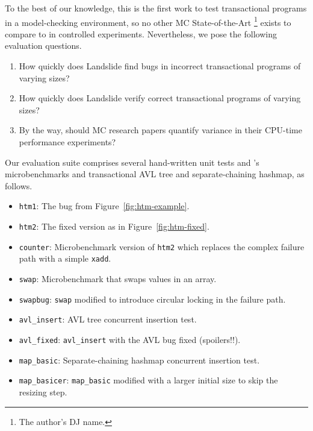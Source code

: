 \documentclass[10pt]{sigplanconf}
\begin{document}
To the best of our knowledge, this is the first work to test transactional programs in a model-checking environment,
so no other MC State-of-the-Art%
\footnote{The author's DJ name.}
exists to compare to in controlled experiments.
Nevertheless, we pose the following evaluation questions.

\begin{enumerate}
	\item How quickly does Landslide find bugs in incorrect transactional programs of varying sizes?
	\item How quickly does Landslide verify correct transactional programs of varying sizes?
	\item By the way, should MC research papers quantify variance in their CPU-time performance experiments?
\end{enumerate}

Our evaluation suite comprises several hand-written unit tests
and \cite{htm-mario}'s microbenchmarks and transactional AVL tree and separate-chaining hashmap,
as follows.

\begin{itemize}
	\item {\tt htm1}: The bug from Figure~\ref{fig:htm-example}. %
	\item {\tt htm2}: The fixed version as in Figure~\ref{fig:htm-fixed}.
	\item {\tt counter}: Microbenchmark version of {\tt htm2} which replaces the complex failure path with a simple {\tt xadd}.
	\item {\tt swap}: Microbenchmark that swaps values in an array.
	\item {\tt swapbug}: {\tt swap} modified to introduce circular locking in the failure path. %
	\item {\tt avl\_insert}: AVL tree concurrent insertion test.
	\item {\tt avl\_fixed}: {\tt avl\_insert} with the AVL bug fixed (spoilers!!).
	\item {\tt map\_basic}: Separate-chaining hashmap concurrent insertion test.
	\item {\tt map\_basicer}: {\tt map\_basic} modified with a larger initial size to skip the resizing step.
\end{itemize}
\end{document}

